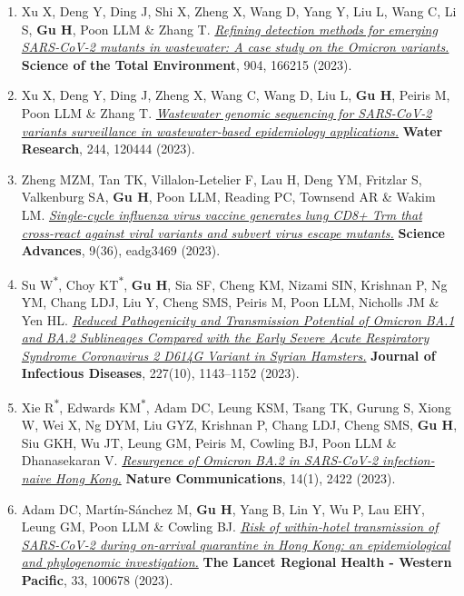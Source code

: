 \documentclass[letterpaper,10pt]{article}
\newcommand{\yr}[1]{\makebox[0pt][l]{\hspace{\linewidth}\hspace{5pt}\small\bfseries #1}\ignorespaces}
\newcommand{\journal}[1]{\textbf{#1}}
\begin{document}
\begin{enumerate}[itemsep=0.5pt, parsep=0pt]
      \item \yr{2023}Xu X, Deng Y, Ding J, Shi X, Zheng X, Wang D, Yang Y, Liu L, Wang C, Li S, \textbf{Gu H}, Poon LLM \& Zhang T. \href{https://doi.org/10.1016/j.scitotenv.2023.166215}{\textit{Refining detection methods for emerging SARS-CoV-2 mutants in wastewater: A case study on the Omicron variants.}} \journal{Science of the Total Environment}, 904, 166215 (2023).
      \item Xu X, Deng Y, Ding J, Zheng X, Wang C, Wang D, Liu L, \textbf{Gu H}, Peiris M, Poon LLM \& Zhang T. \href{https://doi.org/10.1016/j.watres.2023.120444}{\textit{Wastewater genomic sequencing for SARS-CoV-2 variants surveillance in wastewater-based epidemiology applications.}} \journal{Water Research}, 244, 120444 (2023).
      \item Zheng MZM, Tan TK, Villalon-Letelier F, Lau H, Deng YM, Fritzlar S, Valkenburg SA, \textbf{Gu H}, Poon LLM, Reading PC, Townsend AR \& Wakim LM. \href{https://doi.org/10.1126/sciadv.adg3469}{\textit{Single-cycle influenza virus vaccine generates lung CD8+ Trm that cross-react against viral variants and subvert virus escape mutants.}} \journal{Science Advances}, 9(36), eadg3469 (2023).
      \item Su W\textsuperscript{$*$}, Choy KT\textsuperscript{$*$}, \textbf{Gu H}, Sia SF, Cheng KM, Nizami SIN, Krishnan P, Ng YM, Chang LDJ, Liu Y, Cheng SMS, Peiris M, Poon LLM, Nicholls JM \& Yen HL. \href{https://doi.org/10.1093/infdis/jiac276}{\textit{Reduced Pathogenicity and Transmission Potential of Omicron BA.1 and BA.2 Sublineages Compared with the Early Severe Acute Respiratory Syndrome Coronavirus 2 D614G Variant in Syrian Hamsters.}} \journal{Journal of Infectious Diseases}, 227(10), 1143--1152 (2023).
      \item Xie R\textsuperscript{$*$}, Edwards KM\textsuperscript{$*$}, Adam DC, Leung KSM, Tsang TK, Gurung S, Xiong W, Wei X, Ng DYM, Liu GYZ, Krishnan P, Chang LDJ, Cheng SMS, \textbf{Gu H}, Siu GKH, Wu JT, Leung GM, Peiris M, Cowling BJ, Poon LLM \& Dhanasekaran V. \href{https://doi.org/10.1038/s41467-023-38201-5}{\textit{Resurgence of Omicron BA.2 in SARS-CoV-2 infection-naive Hong Kong.}} \journal{Nature Communications}, 14(1), 2422 (2023).
      \item Adam DC, Martín-Sánchez M, \textbf{Gu H}, Yang B, Lin Y, Wu P, Lau EHY, Leung GM, Poon LLM \& Cowling BJ. \href{https://doi.org/10.1016/j.lanwpc.2022.100678}{\textit{Risk of within-hotel transmission of SARS-CoV-2 during on-arrival quarantine in Hong Kong: an epidemiological and phylogenomic investigation.}} \journal{The Lancet Regional Health - Western Pacific}, 33, 100678 (2023).

\end{enumerate}
\end{document}
